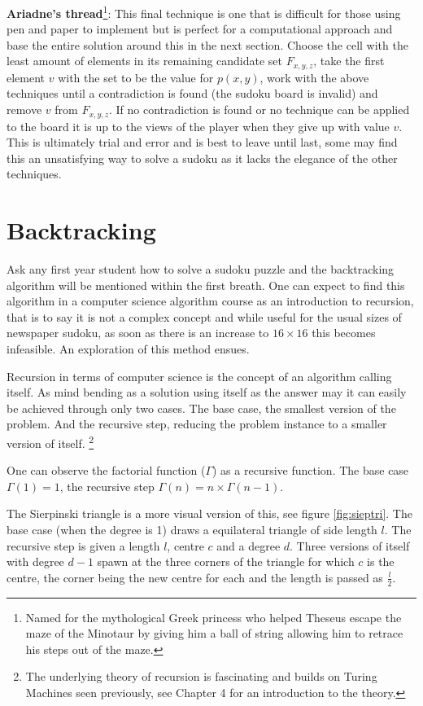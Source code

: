 \documentclass[a4paper,11pt]{report}
\begin{document}
{\textbf{Ariadne's thread}\footnote{Named for the mythological Greek princess who helped Theseus escape the maze of the Minotaur by giving him a ball of string allowing him to retrace his steps out of the maze.}: This final technique is one that is difficult for those using pen and paper to implement but is perfect for a computational approach and base the entire solution around this in the next section. Choose the cell with the least amount of elements in its remaining candidate set $F_{x,y,z}$, take the first element $v$ with the set to be the value for $p(x,y)$, work with the above techniques until a contradiction is found (the sudoku board is invalid) and remove $v$ from $F_{x,y,z}$. If no contradiction is found or no technique can be applied to the board it is up to the views of the player when they give up with value $v$. This is ultimately trial and error and is best to leave until last, some may find this an unsatisfying way to solve a sudoku as it lacks the elegance of the other techniques. 

\section{Backtracking}

Ask any first year student how to solve a sudoku puzzle and the backtracking algorithm will be mentioned within the first breath. One can expect to find this algorithm in a computer science algorithm course as an introduction to recursion, that is to say it is not a complex concept and while useful for the usual sizes of newspaper sudoku, as soon as there is an increase to $16 \times 16$ this becomes infeasible. An exploration of this method ensues.

Recursion in terms of computer science is the concept of an algorithm calling itself. As mind bending as a solution using itself as the answer may it can easily be achieved through only two cases. The base case, the smallest version of the problem. And the recursive step, reducing the problem instance to a smaller version of itself. \footnote{The underlying theory of recursion is fascinating and builds on Turing Machines seen previously, see \cite{salomaa1985computation} Chapter 4 for an introduction to the theory.}

One can observe the factorial function ($\Gamma$) as a recursive function. The base case $\Gamma(1)=1$, the recursive step $\Gamma(n)=n\times \Gamma(n-1)$.

The Sierpinski triangle is a more visual version of this, see figure \ref{fig:sieptri}. The base case (when the degree is 1) draws a equilateral triangle of side length $l$. The recursive step is given a length $l$, centre $c$ and a degree $d$. Three versions of itself with degree $d-1$ spawn at the three corners of the triangle for which $c$ is the centre, the corner being the new centre for each and the length is passed as $\frac{l}{2}$.

}
\end{document}
